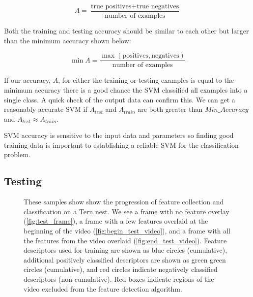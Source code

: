 \begin{equation}
A = \frac{\text{true positives} + \text{true negatives}}{\text{number of examples}}
\label{eq:accuracy}
\end{equation}

Both the training and testing accuracy should be similar to each other but larger than the minimum accuracy shown below:

\begin{equation}
    \min{A} = \frac{\max{(\text{positives}, \text{negatives})}}{\text{number of examples}}
\label{eq:min_accuracy}
\end{equation}

If our accuracy, $A$, for either the training or testing examples is equal to the minimum accuracy there is a good chance the SVM classified all examples into a single class. A quick check of the output data can confirm this. We can get a reasonably accurate SVM if $A_{test}$ and $A_{train}$ are both greater than $Min\_Accuracy$ and $A_{test} \approx A_{train}$.

SVM accuracy is sensitive to the input data and parameters so finding good training data is important to establishing a reliable SVM for the classification problem.


\subsection{Testing}
\label{sec:test_svm}

\begin{sidewaysfigure}[!t]
\centering
{}
\hfil
{}
\hfil
{}
\caption{These samples show show the progression of feature collection and classification on a Tern nest. We see a frame with no feature overlay (\ref{fig:test_frame}), a frame with a few features overlaid at the beginning of the video (\ref{fig:begin_test_video}), and a frame with all the features from the video overlaid (\ref{fig:end_test_video}). Feature descriptors used for training are shown as blue circles (cumulative), additional positively classified descriptors are shown as green green circles (cumulative), and red circles indicate negatively classified descriptors (non-cumulative). Red boxes indicate regions of the video excluded from the feature detection algorithm.}
\label{fig:machine_learning_example}
\end{sidewaysfigure}

